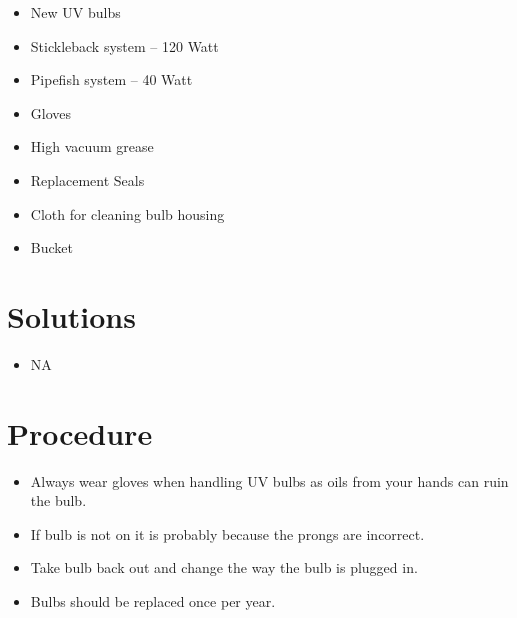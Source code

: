 \documentclass[
  letterpaper,
  DIV=11,
  numbers=noendperiod]{scrreprt}
\providecommand{\tightlist}{%
  \setlength{\itemsep}{0pt}\setlength{\parskip}{0pt}}\usepackage{longtable,booktabs,array}
\begin{document}
\begin{itemize}
\tightlist
\item
  New UV bulbs
\item
  Stickleback system -- 120 Watt
\item
  Pipefish system -- 40 Watt
\item
  Gloves
\item
  High vacuum grease
\item
  Replacement Seals
\item
  Cloth for cleaning bulb housing
\item
  Bucket
\end{itemize}

\hypertarget{solutions-27}{%
\section{Solutions}\label{solutions-27}}

\begin{itemize}
\tightlist
\item
  NA
\end{itemize}

\hypertarget{procedure-36}{%
\section{Procedure}\label{procedure-36}}

\begin{tcolorbox}[enhanced jigsaw, rightrule=.15mm, title=\textcolor{quarto-callout-warning-color}{\faExclamationTriangle}\hspace{0.5em}{NOTES}, titlerule=0mm, opacitybacktitle=0.6, toprule=.15mm, bottomrule=.15mm, opacityback=0, left=2mm, colframe=quarto-callout-warning-color-frame, breakable, coltitle=black, colback=white, colbacktitle=quarto-callout-warning-color!10!white, bottomtitle=1mm, leftrule=.75mm, toptitle=1mm, arc=.35mm]

\begin{itemize}
\tightlist
\item
  Always wear gloves when handling UV bulbs as oils from your hands can
  ruin the bulb.
\item
  If bulb is not on it is probably because the prongs are incorrect.
\item
  Take bulb back out and change the way the bulb is plugged in.
\item
  Bulbs should be replaced once per year.
\end{itemize}

\end{tcolorbox}
\end{document}
